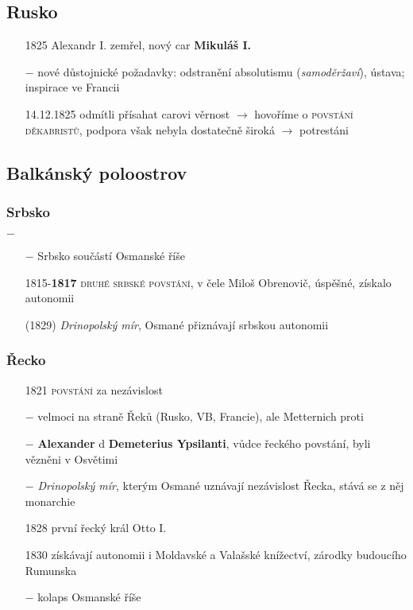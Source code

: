 \documentclass{article}
\begin{document}
\subsection*{Rusko}
\begin{itemize}
    \vspace{-0.5em}
    \setlength\itemsep{0.15em}
    \item[1825] Alexandr I. zemřel, nový car \textbf{Mikuláš I.}
    \item[$-$] nové důstojnické požadavky: odstranění absolutismu (\textit{samoděržaví}), ústava; inspirace ve Francii
    \item[14.12.1825] odmítli přísahat carovi věrnost $\rightarrow$ hovoříme o \textsc{povstání děkabristů}, podpora však nebyla dostatečně široká $\rightarrow$ potrestáni
\end{itemize}


\subsection*{Balkánský poloostrov}
\subsubsection*{Srbsko}$-$
\begin{itemize}
    \vspace{-0.5em}
    \setlength\itemsep{0.15em}
    \item[$-$] Srbsko součástí Osmanské říše
    \item[1815-\textbf{1817}] \textsc{druhé srbské povstání}, v čele Miloš Obrenovič, úspěšné, získalo autonomii
    \item[(1829)] \textit{Drinopolský mír}, Osmané přiznávají srbskou autonomii
\end{itemize}

\subsubsection*{Řecko}
\begin{itemize}
    \vspace{-0.5em}
    \setlength\itemsep{0.15em}
    \item[1821] \textsc{povstání} za nezávislost
    \item[$-$] velmoci na straně Řeků (Rusko, VB, Francie), ale Metternich proti
    \item[$-$] \textbf{Alexander} d \textbf{Demeterius Ypsilanti}, vůdce řeckého povstání, byli vězněni v Osvětimi
    \item[$-$] \textit{Drinopolský mír}, kterým Osmané uznávají nezávislost Řecka, stává se z něj monarchie
    \item[1828] první řecký král Otto I.
    \item[1830] získávají autonomii i Moldavské a Valašské knížectví, zárodky budoucího Rumunska
    \item[$-$] kolaps Osmanské říše
\end{itemize}
\end{document}

